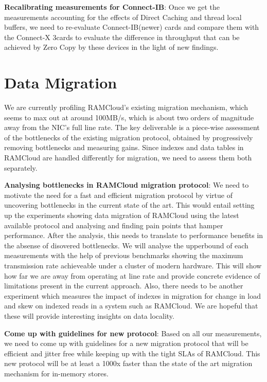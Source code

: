 \textbf{Recalibrating measurements for Connect-IB\textregistered}: Once we get the 
measurements accounting for the effects of Direct Caching and thread local buffers,
we need to re-evaluate Connect-IB\textregistered (newer) cards and compare them 
with the Connect-X 3\textregistered cards to evaluate the difference in 
throughput that can be achieved by Zero Copy by these devices in the light of new findings.



\section{Data Migration}
We are currently profiling RAMCloud’s existing migration mechanism, which seems to max out
at around 100MB/s, which is about two orders of magnitude away from the NIC's full line rate.
The key deliverable is a piece-wise assessment of the bottlenecks of the existing migration
protocol, obtained by progressively removing bottlenecks and measuring gains. Since 
indexes and data tables in RAMCloud are handled differently for migration, we need
to assess them both separately.


\textbf{Analysing bottlenecks in RAMCloud migration protocol}: We need to motivate the need for a fast and efficient migration protocol 
by virtue of uncovering bottlenecks in the current state of the art. This would entail
setting up the experiments showing data migration of RAMCloud using the latest 
available protocol and analysing and finding pain points that hamper performance.
After the analysis, this needs to translate to performance benefits in the absense
of disovered bottlenecks.  We will analyse the upperbound of each measurements with the help
of previous benchmarks showing the maximum transmission rate achieveable under 
a cluster of modern hardware. This will show how far we are away from 
operating at line rate and provide concrete evidence of limitations present in 
the current approach. Also, there needs to be another experiment which measures
the impact of indexes in migration for change in load and skew on indexed reads
in a system such as RAMCloud. We are hopeful that these will provide interesting
insights on data locality.

\textbf{Come up with guidelines for new protocol}: Based on all our measurements,
we need to come up with guidelines for a new migration protocol that will be efficient
and jitter free while keeping up with the tight SLAs of RAMCloud. This new protocol 
will be at least a 1000x faster than the state of the art migration mechanism 
for in-memory stores.



%
